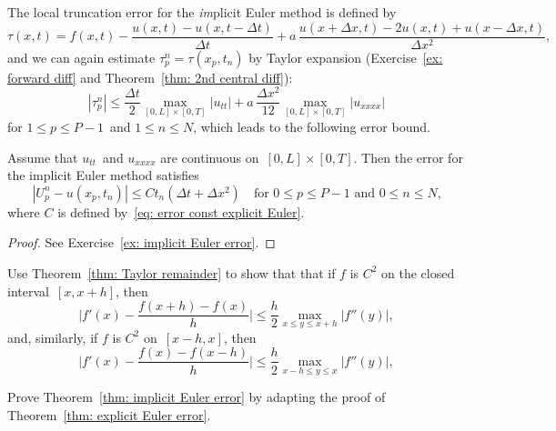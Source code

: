 The local truncation error for the \emph{im}plicit Euler method is defined by
\[
\tau(x,t)=f(x,t)-\frac{u(x,t)-u(x,t-\Delta t)}{\Delta t}
	+a\,\frac{u(x+\Delta x,t)-2u(x,t)+u(x-\Delta x,t)}{\Delta x^2},
\]
and we can again estimate $\tau^n_p=\tau(x_p,t_n)$ by Taylor expansion
(Exercise~\ref{ex: forward diff} and Theorem~\ref{thm: 2nd central diff}):
\[
|\tau^n_p|\le\frac{\Delta t}{2}\max_{[0,L]\times[0,T]}|u_{tt}|
	+a\,\frac{\Delta x^2}{12}\max_{[0,L]\times[0,T]}|u_{xxxx}|
\]
for $1\le p\le P-1$~and $1\le n\le N$, which leads to the following error bound.

\begin{theorem}\label{thm: implicit Euler error}
Assume that $u_{tt}$~and $u_{xxxx}$ are continuous on~$[0,L]\times[0,T]$. Then 
the error for the implicit Euler method satisfies
\[
|U^n_p-u(x_p,t_n)|\le Ct_n(\Delta t+\Delta x^2)
\quad\text{for $0\le p\le P-1$ and $0\le n\le N$,}
\]
where $C$ is defined by~\eqref{eq: error const explicit Euler}.
\end{theorem}
\begin{proof}
See Exercise~\ref{ex: implicit Euler error}.
\end{proof}


\begin{Exercises}
\exercise\label{ex: forward diff}
Use Theorem~\ref{thm: Taylor remainder} to show that that if $f$ is $C^2$ on 
the closed interval~$[x,x+h]$, then
\[
\biggl|f'(x)-\frac{f(x+h)-f(x)}{h}\biggr|
	\le\frac{h}{2}\max_{x\le y\le x+h}|f''(y)|,
\]
and, similarly, if $f$ is $C^2$ on~$[x-h,x]$, then
\[
\biggl|f'(x)-\frac{f(x)-f(x-h)}{h}\biggr|
	\le\frac{h}{2}\max_{x-h\le y\le x}|f''(y)|,
\]

\exercise\label{ex: implicit Euler error}
Prove Theorem~\ref{thm: implicit Euler error} by adapting the proof of 
Theorem~\ref{thm: explicit Euler error}.
\end{Exercises}
